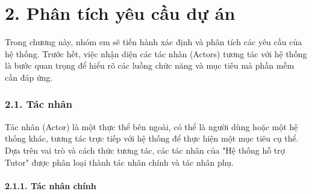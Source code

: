 \part*{2. Phân tích yêu cầu dự án}
Trong chương này, nhóm em sẽ tiến hành xác định và phân tích các yêu cầu của hệ thống. Trước hết, việc nhận diện các tác nhân (Actors) tương tác với hệ thống là bước quan trọng để hiểu rõ các luồng chức năng và mục tiêu mà phần mềm cần đáp ứng.


\section*{2.1. Tác nhân}
Tác nhân (Actor) là một thực thể bên ngoài, có thể là người dùng hoặc một hệ thống khác, tương tác trực tiếp với hệ thống để thực hiện một mục tiêu cụ thể. Dựa trên vai trò và cách thức tương tác, các tác nhân của "Hệ thống hỗ trợ Tutor" được phân loại thành tác nhân chính và tác nhân phụ.


\subsection*{2.1.1. Tác nhân chính}

